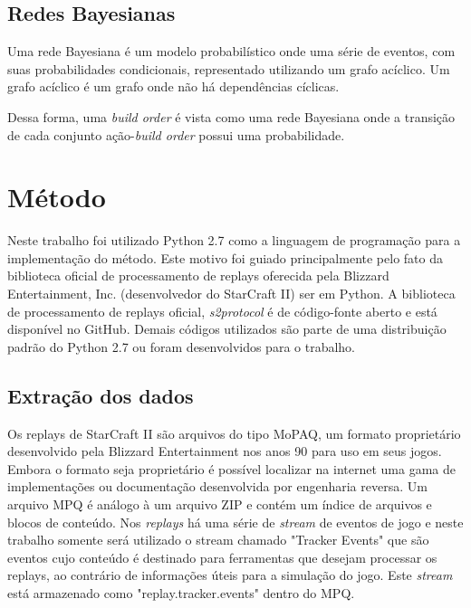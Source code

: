		\section{Redes Bayesianas}
Uma rede Bayesiana \cite{ruggeri2007encyclopedia} é um modelo probabilístico onde uma série de eventos, com suas probabilidades condicionais, representado utilizando um grafo acíclico. Um grafo acíclico é um grafo onde não há dependências cíclicas.


Dessa forma, uma \textit{build order} é vista como uma rede Bayesiana onde a transição de cada conjunto ação-\textit{build order} possui uma probabilidade.

	\chapter{Método}
Neste trabalho foi utilizado Python 2.7 como a linguagem de programação para a implementação do método. Este motivo foi guiado principalmente pelo fato da biblioteca oficial de processamento de replays oferecida pela Blizzard Entertainment, Inc. (desenvolvedor do StarCraft II) ser em Python. A biblioteca de processamento de replays oficial, \textit{s2protocol}\cite{s2protocol} é de código-fonte aberto e está disponível no GitHub. Demais códigos utilizados são parte de uma distribuição padrão do Python 2.7 ou foram desenvolvidos para o trabalho.

\section{Extração dos dados}

Os replays de StarCraft II são arquivos do tipo MoPAQ, um formato proprietário desenvolvido pela Blizzard Entertainment nos anos 90 para uso em seus jogos. Embora o formato seja proprietário é possível localizar na internet uma gama de implementações ou documentação desenvolvida por engenharia reversa. Um arquivo MPQ é análogo à um arquivo ZIP e contém um índice de arquivos e blocos de conteúdo. Nos \textit{replays} há uma série de \textit{stream} de eventos de jogo e neste trabalho somente será utilizado o stream chamado "Tracker Events" que são eventos cujo conteúdo é destinado para ferramentas que desejam processar os replays, ao contrário de informações úteis para a simulação do jogo. Este \textit{stream} está armazenado como "replay.tracker.events" dentro do MPQ.

